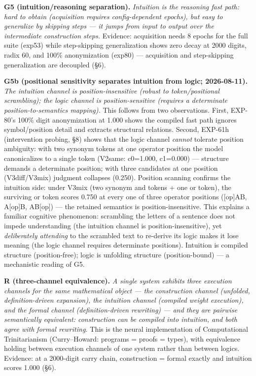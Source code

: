 \documentclass[
]{article}
\begin{document}
\textbf{G5 (intuition/reasoning separation).} \emph{Intuition is the
reasoning fast path: hard to obtain (acquisition requires
config-dependent epochs), but easy to generalize by skipping steps ---
it jumps from input to output over the intermediate construction steps.}
Evidence: acquisition needs 8 epochs for the full suite (exp53) while
step-skipping generalization shows zero decay at 2000 digits, radix 60,
and 100\% anonymization (exp80) --- acquisition and step-skipping
generalization are decoupled (§6).

\textbf{G5b (positional sensitivity separates intuition from logic;
2026-08-11).} \emph{The intuition channel is position-insensitive
(robust to token/positional scrambling); the logic channel is
position-sensitive (requires a determinate position-to-semantics
mapping).} This follows from two observations. First, EXP-80's 100\%
digit anonymization at 1.000 shows the compiled fast path ignores
symbol/position detail and extracts structural relations. Second,
EXP-61h (intervention probing, §8) shows that the logic channel
\emph{cannot} tolerate position ambiguity: with two synonym tokens at
one operator position the model canonicalizes to a single token (V2same:
c0=1.000, c1=0.000) --- structure demands a determinate position; with
three candidates at one position (V3diff/V3mix) judgment collapses
(0.250). Position scanning confirms the intuition side: under V3mix (two
synonym and tokens + one or token), the surviving or token scores 0.750
at every one of three operator positions ({[}op{]}AB, A{[}op{]}B,
AB{[}op{]}) --- the retained semantics is position-insensitive. This
explains a familiar cognitive phenomenon: scrambling the letters of a
sentence does not impede understanding (the intuition channel is
position-insensitive), yet \emph{deliberately attending} to the
scrambled text to re-derive its logic makes it lose meaning (the logic
channel requires determinate positions). Intuition is compiled structure
(position-free); logic is unfolding structure (position-bound) --- a
mechanistic reading of G5.

\textbf{R (three-channel equivalence).} \emph{A single system exhibits
three execution channels for the same mathematical object --- the
construction channel (unfolded, definition-driven expansion), the
intuition channel (compiled weight execution), and the formal channel
(definition-driven rewriting) --- and they are pairwise semantically
equivalent: construction can be compiled into intuition, and both agree
with formal rewriting.} This is the neural implementation of
Computational Trinitarianism (Curry--Howard: programs = proofs = types),
with equivalence holding between execution channels of one system rather
than between logics. Evidence: at a 2000-digit carry chain, construction
= formal exactly and intuition scores 1.000 (§6).
\end{document}
